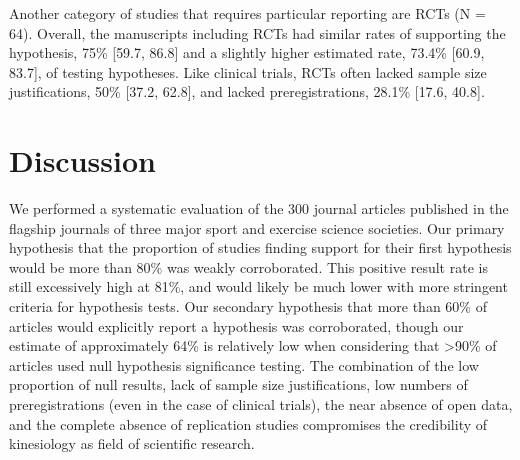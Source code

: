 \documentclass[]{cik}%
\begin{document}
Another category of studies that requires particular reporting are RCTs
(N = 64). Overall, the manuscripts including RCTs had similar rates of
supporting the hypothesis, 75\% {[}59.7, 86.8{]} and a slightly higher
estimated rate, 73.4\% {[}60.9, 83.7{]}, of testing hypotheses. Like
clinical trials, RCTs often lacked sample size justifications, 50\%
{[}37.2, 62.8{]}, and lacked preregistrations, 28.1\% {[}17.6, 40.8{]}.

\hypertarget{discussion}{%
\section{Discussion}\label{discussion}}

We performed a systematic evaluation of the 300 journal articles
published in the flagship journals of three major sport and exercise
science societies. Our primary hypothesis that the proportion of studies
finding support for their first hypothesis would be more than 80\% was
weakly corroborated. This positive result rate is still excessively high
at 81\%, and would likely be much lower with more stringent criteria for
hypothesis tests. Our secondary hypothesis that more than 60\% of
articles would explicitly report a hypothesis was corroborated, though
our estimate of approximately 64\% is relatively low when considering
that \textgreater90\% of articles used null hypothesis significance
testing. The combination of the low proportion of null results, lack of
sample size justifications, low numbers of preregistrations (even in the
case of clinical trials), the near absence of open data, and the
complete absence of replication studies compromises the credibility of
kinesiology as field of scientific research.
\end{document}
